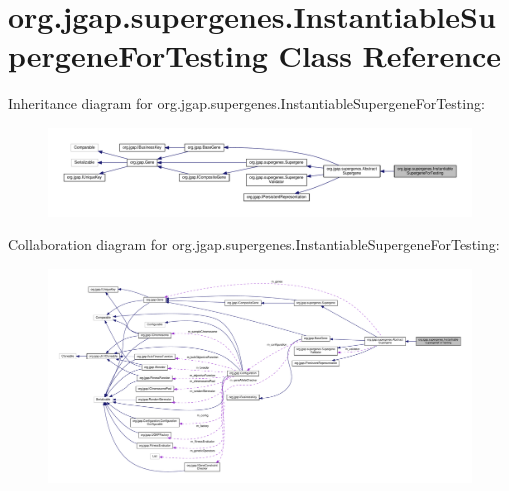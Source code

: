 \hypertarget{classorg_1_1jgap_1_1supergenes_1_1_instantiable_supergene_for_testing}{\section{org.\-jgap.\-supergenes.\-Instantiable\-Supergene\-For\-Testing Class Reference}
\label{classorg_1_1jgap_1_1supergenes_1_1_instantiable_supergene_for_testing}
}


Inheritance diagram for org.\-jgap.\-supergenes.\-Instantiable\-Supergene\-For\-Testing\-:
\nopagebreak
\begin{figure}[H]
\begin{center}
\leavevmode
\includegraphics[width=350pt]{classorg_1_1jgap_1_1supergenes_1_1_instantiable_supergene_for_testing__inherit__graph}
\end{center}
\end{figure}


Collaboration diagram for org.\-jgap.\-supergenes.\-Instantiable\-Supergene\-For\-Testing\-:
\nopagebreak
\begin{figure}[H]
\begin{center}
\leavevmode
\includegraphics[width=350pt]{classorg_1_1jgap_1_1supergenes_1_1_instantiable_supergene_for_testing__coll__graph}
\end{center}
\end{figure}
